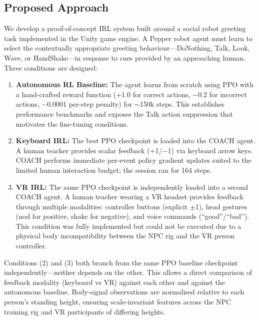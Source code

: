 \documentclass[../report.tex]{subfiles}
\begin{document}
    \subsection{Proposed Approach}
    \label{sec:introduction:proposed_approach}

    We develop a proof-of-concept IRL system built around a social robot greeting task implemented in the Unity game engine. A Pepper robot agent must learn to select the contextually appropriate greeting behaviour---DoNothing, Talk, Look, Wave, or HandShake---in response to cues provided by an approaching human. Three conditions are designed:

    \begin{enumerate}
        \item \textbf{Autonomous RL Baseline:} The agent learns from scratch using PPO with a hand-crafted reward function (+1.0 for correct actions, $-$0.2 for incorrect actions, $-$0.0001 per-step penalty) for $\sim$150k steps. This establishes performance benchmarks and exposes the Talk action suppression that motivates the fine-tuning conditions.

        \item \textbf{Keyboard IRL:} The best PPO checkpoint is loaded into the COACH agent. A human teacher provides scalar feedback (+1/$-$1) via keyboard arrow keys. COACH performs immediate per-event policy gradient updates suited to the limited human interaction budget; the session ran for 164 steps.

        \item \textbf{VR IRL:} The same PPO checkpoint is independently loaded into a second COACH agent. A human teacher wearing a VR headset provides feedback through multiple modalities: controller buttons (explicit $\pm$1), head gestures (nod for positive, shake for negative), and voice commands (``good''/``bad''). This condition was fully implemented but could not be executed due to a physical body incompatibility between the NPC rig and the VR person controller.
    \end{enumerate}

    Conditions (2) and (3) both branch from the same PPO baseline checkpoint independently---neither depends on the other. This allows a direct comparison of feedback modality (keyboard vs VR) against each other and against the autonomous baseline. Body-signal observations are normalised relative to each person's standing height, ensuring scale-invariant features across the NPC training rig and VR participants of differing heights.
\end{document}
